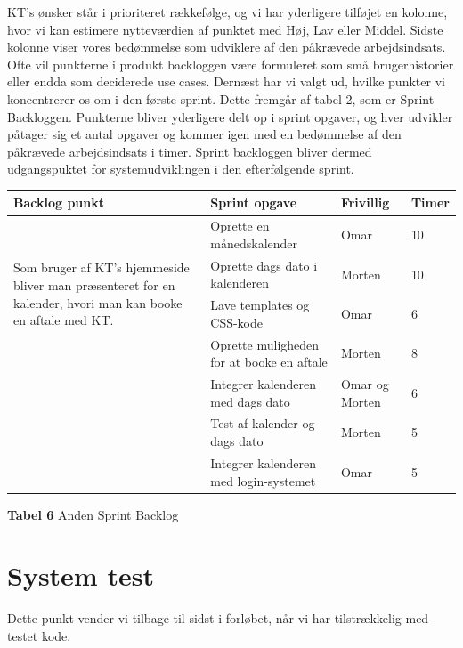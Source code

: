 \documentclass[12pt]{article}   %
\begin{document}
KT's ønsker står i prioriteret rækkefølge, og vi har yderligere tilføjet en
kolonne, hvor vi kan estimere nytteværdien af punktet med Høj, Lav eller
Middel. Sidste kolonne viser vores bedømmelse som udviklere af den påkrævede
arbejdsindsats. Ofte vil punkterne i produkt backloggen være formuleret som
små brugerhistorier eller endda som deciderede use cases. Dernæst har vi
valgt ud, hvilke punkter vi koncentrerer os om i den første sprint. Dette
fremgår af tabel 2, som er Sprint Backloggen. Punkterne bliver yderligere
delt op i sprint opgaver, og hver udvikler påtager sig et antal opgaver og
kommer igen med en bedømmelse af den påkrævede arbejdsindsats i timer. Sprint
backloggen bliver dermed udgangspuktet for systemudviklingen i den
efterfølgende sprint. 


\begin{center}
	\begin{tabular}{|l|p{4cm}|l|l|}
		\hline
		Backlog punkt & Sprint opgave & Frivillig & Timer\\ \hline
		\multirow{4}{4cm}{Som bruger af KT's hjemmeside bliver man præsenteret for en kalender, hvori man
		kan booke en aftale med KT.} & Oprette en månedskalender & Omar  & 10 \\
		& Oprette dags dato i kalenderen & Morten & 10 \\
		& Lave templates og CSS-kode & Omar & 6 \\
		& Oprette muligheden for at booke en aftale & Morten
		& 8 \\ 
		& Integrer kalenderen med dags dato & Omar og Morten & 6 \\
		& Test af kalender og dags dato & Morten & 5
		\\ & Integrer kalenderen med login-systemet & Omar & 5 \\
		\hline

	\end{tabular}
\end{center}

\begin{center}
\textbf{Tabel 6} Anden Sprint Backlog
\end{center}

\vspace{0.5cm}

\section{System test}
Dette punkt vender vi tilbage til sidst i forløbet, når vi har tilstrækkelig med testet kode.
\end{document}
